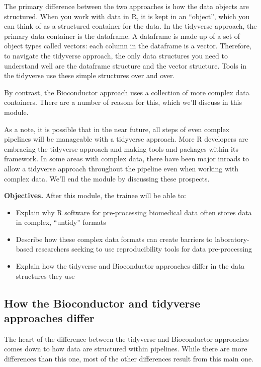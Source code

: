 \documentclass[]{tufte-book}
\providecommand{\tightlist}{%
  \setlength{\itemsep}{0pt}\setlength{\parskip}{0pt}}
\begin{document}
The primary difference between the two approaches is how the data objects are
structured. When you work with data in R, it is kept in an ``object'', which you
can think of as a structured container for the data. In the tidyverse approach,
the primary data container is the dataframe. A dataframe is made up of a set of
object types called vectors: each column in the dataframe is a vector.
Therefore, to navigate the tidyverse approach, the only data structures you need
to understand well are the dataframe structure and the vector structure. Tools
in the tidyverse use these simple structures over and over.

By contrast, the Bioconductor approach uses a collection of more complex data
containers. There are a number of reasons for this, which we'll discuss in this
module.

As a note, it is possible that in the near future, all steps of even
complex pipelines will be manageable with a tidyverse approach. More
R developers are embracing the tidyverse approach and making tools and packages
within its framework. In some areas with complex data, there have been
major inroads to allow a tidyverse approach throughout the pipeline even
when working with complex data. We'll end the module by discussing these
prospects.

\textbf{Objectives.} After this module, the trainee will be able to:

\begin{itemize}
\tightlist
\item
  Explain why R software for pre-processing biomedical data often stores
  data in complex, ``untidy'' formats
\item
  Describe how these complex data formats can create barriers to
  laboratory-based researchers seeking to use reproducibility tools for
  data pre-processing
\item
  Explain how the tidyverse and Bioconductor approaches differ in the
  data structures they use
\end{itemize}

\subsection{How the Bioconductor and tidyverse approaches differ}\label{how-the-bioconductor-and-tidyverse-approaches-differ}

The heart of the difference between the tidyverse and Bioconductor approaches
comes down to how data are structured within pipelines. While there are more
differences than this one, most of the other differences result from this
main one.
\end{document}
